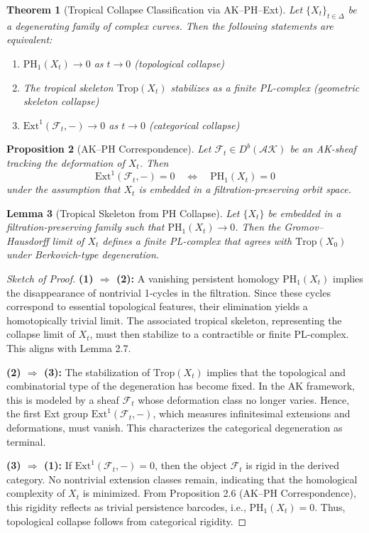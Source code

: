 \documentclass[11pt]{article}
\newtheorem{theorem}{Theorem}[section]
\newtheorem{lemma}[theorem]{Lemma}
\newtheorem{proposition}[theorem]{Proposition}
\begin{document}
\begin{theorem}[Tropical Collapse Classification via AK--PH--Ext]
Let $\{X_t\}_{t \in \Delta}$ be a degenerating family of complex curves. Then the following statements are equivalent:
\begin{enumerate}
    \item $\mathrm{PH}_1(X_t) \to 0$ as $t \to 0$ (topological collapse)
    \item The tropical skeleton $\mathrm{Trop}(X_t)$ stabilizes as a finite PL-complex (geometric skeleton collapse)
    \item $\mathrm{Ext}^1(\mathcal{F}_t, -) \to 0$ as $t \to 0$ (categorical collapse)
\end{enumerate}
\end{theorem}

\begin{proposition}[AK--PH Correspondence]
Let $\mathcal{F}_t \in D^b(\mathcal{AK})$ be an AK-sheaf tracking the deformation of $X_t$. Then
\[
\mathrm{Ext}^1(\mathcal{F}_t, -) = 0 \quad \Longleftrightarrow \quad \mathrm{PH}_1(X_t) = 0
\]
under the assumption that $X_t$ is embedded in a filtration-preserving orbit space.
\end{proposition}

\begin{lemma}[Tropical Skeleton from PH Collapse]
Let $\{X_t\}$ be embedded in a filtration-preserving family such that $\mathrm{PH}_1(X_t) \to 0$. Then the Gromov--Hausdorff limit of $X_t$ defines a finite PL-complex that agrees with $\mathrm{Trop}(X_0)$ under Berkovich-type degeneration.
\end{lemma}

\begin{proof}[Sketch of Proof]
\textbf{(1) $\Rightarrow$ (2):} 
A vanishing persistent homology $\mathrm{PH}_1(X_t)$ implies the disappearance of nontrivial 1-cycles in the filtration. Since these cycles correspond to essential topological features, their elimination yields a homotopically trivial limit. The associated tropical skeleton, representing the collapse limit of $X_t$, must then stabilize to a contractible or finite PL-complex. This aligns with Lemma 2.7.

\textbf{(2) $\Rightarrow$ (3):}
The stabilization of $\mathrm{Trop}(X_t)$ implies that the topological and combinatorial type of the degeneration has become fixed. In the AK framework, this is modeled by a sheaf $\mathcal{F}_t$ whose deformation class no longer varies. Hence, the first Ext group $\mathrm{Ext}^1(\mathcal{F}_t, -)$, which measures infinitesimal extensions and deformations, must vanish. This characterizes the categorical degeneration as terminal.

\textbf{(3) $\Rightarrow$ (1):}
If $\mathrm{Ext}^1(\mathcal{F}_t, -) = 0$, then the object $\mathcal{F}_t$ is rigid in the derived category. No nontrivial extension classes remain, indicating that the homological complexity of $X_t$ is minimized. From Proposition 2.6 (AK--PH Correspondence), this rigidity reflects as trivial persistence barcodes, i.e., $\mathrm{PH}_1(X_t) = 0$. Thus, topological collapse follows from categorical rigidity.
\end{proof}
\end{document}
